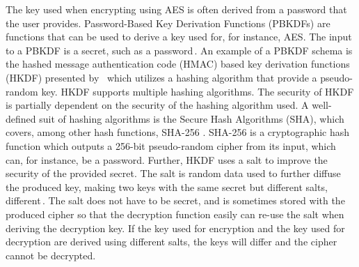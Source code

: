The key used when encrypting using AES is often derived from a password that the user provides. Password-Based Key Derivation Functions (\gls{PBKDF}s) are functions that can be used to derive a key used for, for instance, AES. The input to a PBKDF is a secret, such as a password\,\cite{kodwaniSecurityKeyDerivation2021}. An example of a PBKDF schema is the hashed message authentication code (\gls{HMAC}) based key derivation functions (\gls{HKDF}) presented by \citeauthor{krawczykCryptographicExtractionKey2010}\,\cite{krawczykCryptographicExtractionKey2010}\cite{krawczykHMACbasedExtractandExpandKey2010} which utilizes a hashing algorithm that provide a pseudo-random key. HKDF supports multiple hashing algorithms. The security of HKDF is partially dependent on the security of the hashing algorithm used. A well-defined suit of hashing algorithms is the Secure Hash Algorithms (\gls{SHA}), which covers, among other hash functions, SHA-256 \cite{hansenUSSecureHash2011}. SHA-256 is a cryptographic hash function which outputs a 256-bit pseudo-random cipher from its input, which can, for instance, be a password. Further, HKDF uses a salt to improve the security of the provided secret. The salt is random data used to further diffuse the produced key, making two keys with the same secret but different salts, different\,\cite{ariasAddingSaltHashing2021}. The salt does not have to be secret, and is sometimes stored with the produced cipher so that the decryption function easily can re-use the salt when deriving the decryption key. If the key used for encryption and the key used for decryption are derived using different salts, the keys will differ and the cipher cannot be decrypted.
